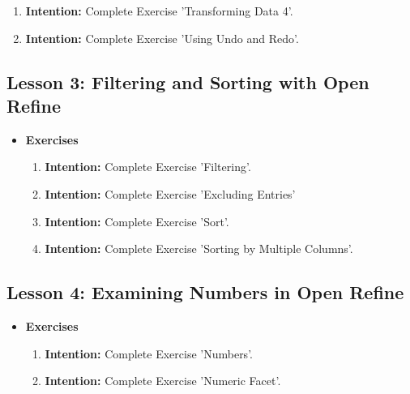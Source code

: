 \documentclass{article}
\begin{document}
\begin{itemize}
\begin{enumerate}
\item{\textbf{Intention:} Complete Exercise 'Transforming Data 4'.}

\item{\textbf{Intention:} Complete Exercise 'Using Undo and Redo'.}

\end{enumerate}
\end{itemize}



\subsection{Lesson 3: Filtering and Sorting with Open Refine}

\begin{itemize}
\item{\textbf{Exercises}}

\begin{enumerate}

\item{\textbf{Intention:} Complete Exercise 'Filtering'.}

\item{\textbf{Intention:} Complete Exercise 'Excluding Entries'}

\item{\textbf{Intention:} Complete Exercise 'Sort'.}

\item{\textbf{Intention:} Complete Exercise 'Sorting by Multiple Columns'.}



\end{enumerate}
\end{itemize}



\subsection{Lesson 4: Examining Numbers in Open Refine}

\begin{itemize}
\item{\textbf{Exercises}}

\begin{enumerate}

\item{\textbf{Intention:} Complete Exercise 'Numbers'.}

\item{\textbf{Intention:} Complete Exercise 'Numeric Facet'.}



\end{enumerate}
\end{itemize}
\end{document}
